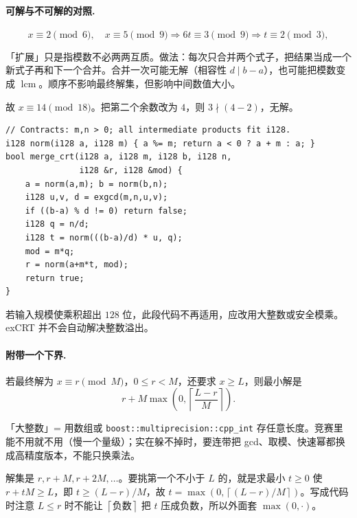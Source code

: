 \documentclass[UTF8,a4paper,11pt,twoside,openright,fontset=fandol]{ctexbook}
\theoremstyle{definition}
\newcommand{\lcm}{\operatorname{lcm}}
\newcommand{\ceil}[1]{\left\lceil #1\right\rceil}
\begin{document}
\paragraph{可解与不可解的对照.}
\[
 x\equiv2\pmod6,\quad x\equiv5\pmod9
 \Longrightarrow 6t\equiv3\pmod9
 \Longrightarrow t\equiv2\pmod3,
\]

\begin{tip}[词义：扩展 CRT 的「扩展」]
「扩展」只是指模数不必两两互质。做法：每次只合并两个式子，把结果当成一个新式子再和下一个合并。合并一次可能无解（相容性 $d\mid b-a$），也可能把模数变成 $\lcm$。顺序不影响最终解集，但影响中间数值大小。
\end{tip}

故 $x\equiv14\pmod{18}$。把第二个余数改为 $4$，则 $3\nmid(4-2)$，无解。

\begin{lstlisting}
// Contracts: m,n > 0; all intermediate products fit i128.
i128 norm(i128 a, i128 m) { a %= m; return a < 0 ? a + m : a; }
bool merge_crt(i128 a, i128 m, i128 b, i128 n,
               i128 &r, i128 &mod) {
    a = norm(a,m); b = norm(b,n);
    i128 u,v, d = exgcd(m,n,u,v);
    if ((b-a) % d != 0) return false;
    i128 q = n/d;
    i128 t = norm(((b-a)/d) * u, q);
    mod = m*q;
    r = norm(a+m*t, mod);
    return true;
}
\end{lstlisting}
若输入规模使乘积超出 $128$ 位，此段代码不再适用，应改用大整数或安全模乘。exCRT 并不会自动解决整数溢出。

\paragraph{附带一个下界.} 若最终解为 $x\equiv r\pmod M$，$0\le r<M$，还要求 $x\ge L$，则最小解是
\[
 r+M\max\!\left(0,\ceil{\frac{L-r}{M}}\right).
\]

\begin{tip}
「大整数」= 用数组或 \texttt{boost::multiprecision::cpp\_int} 存任意长度。竞赛里能不用就不用（慢一个量级）；实在躲不掉时，要连带把 gcd、取模、快速幂都换成高精度版本，不能只换乘法。
\end{tip}

\begin{tip}[下界公式是怎么推出来的]
解集是 $r,r+M,r+2M,\ldots$。要挑第一个不小于 $L$ 的，就是求最小 $t\ge0$ 使 $r+tM\ge L$，即 $t\ge(L-r)/M$，故 $t=\max(0,\ceil{(L-r)/M})$。写成代码时注意 $L\le r$ 时不能让 $\ceil{\text{负数}}$ 把 $t$ 压成负数，所以外面套 $\max(0,\cdot)$。
\end{tip}
\end{document}
